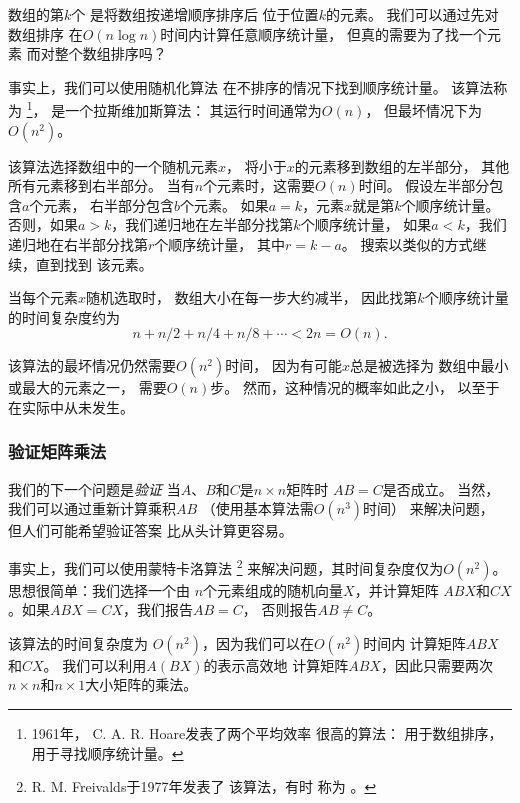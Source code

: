 
数组的第$k$个
是将数组按递增顺序排序后
位于位置$k$的元素。
我们可以通过先对数组排序
在$O(n \log n)$时间内计算任意顺序统计量，
但真的需要为了找一个元素
而对整个数组排序吗？

事实上，我们可以使用随机化算法
在不排序的情况下找到顺序统计量。
该算法称为
\footnote{1961年，
C. A. R. Hoare发表了两个平均效率
很高的算法： 
\cite{hoa61a}用于数组排序，
\cite{hoa61b}用于寻找顺序统计量。}，
是一个拉斯维加斯算法：
其运行时间通常为$O(n)$，
但最坏情况下为$O(n^2)$。

该算法选择数组中的一个随机元素$x$，
将小于$x$的元素移到数组的左半部分，
其他所有元素移到右半部分。
当有$n$个元素时，这需要$O(n)$时间。
假设左半部分包含$a$个元素，
右半部分包含$b$个元素。
如果$a=k$，元素$x$就是第$k$个顺序统计量。
否则，如果$a>k$，我们递归地在左半部分找第$k$个顺序统计量，
如果$a<k$，我们递归地在右半部分找第$r$个顺序统计量，
其中$r=k-a$。
搜索以类似的方式继续，直到找到
该元素。

当每个元素$x$随机选取时，
数组大小在每一步大约减半，
因此找第$k$个顺序统计量的时间复杂度约为
\[n+n/2+n/4+n/8+\cdots < 2n = O(n).\]

该算法的最坏情况仍然需要$O(n^2)$时间，
因为有可能$x$总是被选择为
数组中最小或最大的元素之一，
需要$O(n)$步。
然而，这种情况的概率如此之小，
以至于在实际中从未发生。

\subsubsection{验证矩阵乘法}


我们的下一个问题是\emph{验证}
当$A$、$B$和$C$是$n \times n$矩阵时
$AB=C$是否成立。
当然，我们可以通过重新计算乘积$AB$
（使用基本算法需$O(n^3)$时间）
来解决问题，
但人们可能希望验证答案
比从头计算更容易。

事实上，我们可以使用蒙特卡洛算法
\footnote{R. M. Freivalds于1977年发表了
该算法\cite{fre77}，有时
称为 。}
来解决问题，其时间复杂度仅为$O(n^2)$。
思想很简单：我们选择一个由
$n$个元素组成的随机向量$X$，并计算矩阵
$ABX$和$CX$。如果$ABX=CX$，我们报告$AB=C$，
否则报告$AB \neq C$。

该算法的时间复杂度为
$O(n^2)$，因为我们可以在$O(n^2)$时间内
计算矩阵$ABX$和$CX$。
我们可以利用$A(BX)$的表示高效地
计算矩阵$ABX$，因此只需要两次
$n \times n$和$n \times 1$大小矩阵的乘法。

